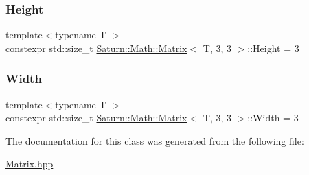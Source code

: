 \subsubsection{\texorpdfstring{Height}{Height}}
{\footnotesize\ttfamily template$<$typename T $>$ \\
constexpr std\+::size\+\_\+t \mbox{\hyperlink{class_saturn_1_1_math_1_1_matrix}{Saturn\+::\+Math\+::\+Matrix}}$<$ T, 3, 3 $>$\+::Height = 3\hspace{0.3cm}{\ttfamily [static]}}

\mbox{\label{class_saturn_1_1_math_1_1_matrix_3_01_t_00_013_00_013_01_4_a7df732e9641685e8dbbff6f06c6eedab}} 
\subsubsection{\texorpdfstring{Width}{Width}}
{\footnotesize\ttfamily template$<$typename T $>$ \\
constexpr std\+::size\+\_\+t \mbox{\hyperlink{class_saturn_1_1_math_1_1_matrix}{Saturn\+::\+Math\+::\+Matrix}}$<$ T, 3, 3 $>$\+::Width = 3\hspace{0.3cm}{\ttfamily [static]}}



The documentation for this class was generated from the following file\+:\begin{DoxyCompactItemize}
\item 
\mbox{\hyperlink{_matrix_8hpp}{Matrix.\+hpp}}\end{DoxyCompactItemize}
